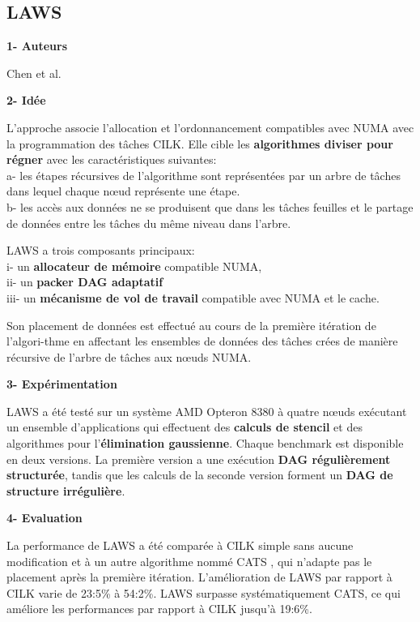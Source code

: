 \subsection{LAWS} %
%
\textbf{1- Auteurs}

Chen et al. \cite{Che38}

\textbf{2- Idée}

L'approche associe l'allocation et l'ordonnancement compatibles avec NUMA avec la programmation des tâches CILK. 
Elle cible les \textbf{algorithmes diviser pour régner} avec les caractéristiques suivantes: \\
a- les étapes récursives de l'algorithme sont représentées par un arbre de tâches dans lequel chaque nœud représente une étape.\\
b- les accès aux données ne se produisent que dans les tâches feuilles et le partage de données entre les tâches du même niveau dans l'arbre. 

LAWS a trois composants principaux: \\
i- un \textbf{allocateur de mémoire} compatible NUMA, \\
ii- un \textbf{packer DAG adaptatif}\\
iii- un \textbf{mécanisme de vol de travail} compatible avec NUMA et le cache. 

Son placement de données est effectué au cours de la première itération de l'algori-thme en affectant les ensembles de données des tâches crées de manière récursive de l'arbre de tâches aux nœuds NUMA.

\textbf{3- Expérimentation}

LAWS a été testé sur un système AMD Opteron 8380 à quatre nœuds exécutant un ensemble d'applications qui effectuent des \textbf{calculs de stencil} et des algorithmes pour l'\textbf{élimination gaussienne}. 
Chaque benchmark est disponible en deux versions. 
La première version a une exécution \textbf{DAG régulièrement structurée}, tandis que les calculs de la seconde version forment un \textbf{DAG de structure irrégulière}. 

\textbf{4- Evaluation}

La performance de LAWS a été comparée à CILK simple sans aucune modification et à un autre algorithme nommé CATS \cite{Che39}, qui n'adapte pas le placement après la première itération. 
L'amélioration de LAWS par rapport à CILK varie de 23:5\% à 54:2\%. 
LAWS surpasse systématiquement CATS, ce qui améliore les performances par rapport à CILK jusqu'à 19:6\%. 

